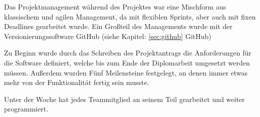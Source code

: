 \label{sec:ProManZELIA}

Das Projektmanagement während des Projektes war eine Mischform aus klassischem und agilen Management, da mit flexiblen Sprints, aber auch mit fixen Deadlines gearbeitet wurde. Ein Großteil des Managements wurde mit der Versionierungssoftware GitHub (siehe Kapitel: \ref{sec:github} GitHub)

Zu Beginn wurde durch das Schreiben des Projektantrags die Anforderungen für die Software definiert, welche bis zum Ende der Diplomarbeit umgesetzt werden müssen. Außerdem wurden Fünf Meilensteine festgelegt, an denen immer etwas mehr von der Funktionalität fertig sein musste.

Unter der Woche hat jedes Teammitglied an seinem Teil gearbeitet und weiter programmiert.
